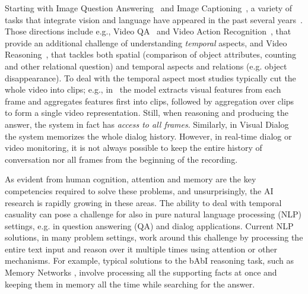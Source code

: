 Starting with Image Question Answering~\cite{malinowski2014multi,antol2015} and Image Captioning~\cite{karpathy2015deep}, a variety of tasks that integrate vision and language have appeared in the past several years~\cite{mogadala2019trends}. 
Those directions include e.g., Video QA~\cite{MovieQA} and Video Action Recognition~\cite{monfort2019moments}, that provide an additional challenge of understanding \emph{temporal} aspects, and Video Reasoning~\cite{song2018explore,yang2018dataset}, that tackles both spatial (comparison of object attributes, counting and other relational question) and temporal aspects and relations (e.g. object disappearance).
To deal with the temporal aspect most studies typically cut the whole video into clips; e.g., in~\cite{song2018explore} the model extracts visual features from each frame and aggregates features first into clips, followed by aggregation over clips to form a single video representation.
Still, when reasoning and producing the answer, the system in fact has \textit{access to all frames}. 
Similarly, in Visual Dialog~\cite{das2017visual} the system memorizes the whole dialog history.
However, in real-time dialog or video monitoring, it is not always possible to keep the entire history of conversation nor all frames from the beginning of the recording.  


As evident from human cognition, attention and memory are the key competencies required to solve these problems, and unsurprisingly, the AI research is rapidly growing in these areas.
The ability to deal with temporal casuality can pose a challenge for also in pure natural language processing (NLP) settings, e.g. in question answering (QA) and dialog applications.  
Current NLP solutions, in many problem settings, work around this challenge by processing the entire text input and reason over it multiple times using attention \cite{vaswani2017attention} or other mechanisms.
For example, typical solutions to the bAbI reasoning task, such as Memory Networks \cite{weston2014memory}, involve processing all the supporting facts at once and keeping them in memory all the time while searching for the answer.

